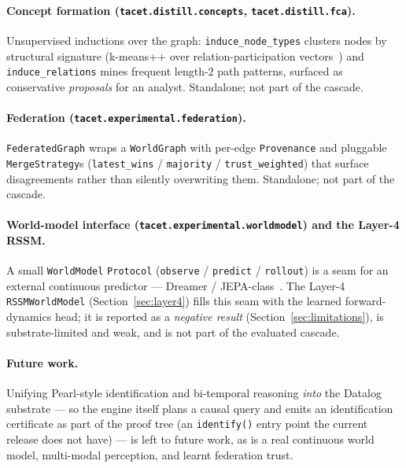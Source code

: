 \documentclass[11pt]{article}
\theoremstyle{plain}
\begin{document}
\paragraph{Concept formation (\texttt{tacet.distill.concepts}, \texttt{tacet.distill.fca}).}
Unsupervised inductions over the graph: \texttt{induce\_node\_types} clusters
nodes by structural signature (k-means++ over relation-participation
vectors~\citep{arthur2007kmeanspp}) and \texttt{induce\_relations} mines
frequent length-2 path patterns, surfaced as conservative \emph{proposals} for
an analyst. Standalone; not part of the cascade.

\paragraph{Federation (\texttt{tacet.experimental.federation}).}
\texttt{FederatedGraph} wraps a \texttt{WorldGraph} with per-edge
\texttt{Provenance} and pluggable \texttt{MergeStrategy}s
(\texttt{latest\_wins} / \texttt{majority} / \texttt{trust\_weighted}) that
surface disagreements rather than silently overwriting them. Standalone; not
part of the cascade.

\paragraph{World-model interface (\texttt{tacet.experimental.worldmodel}) and the Layer-4 RSSM.}
A small \texttt{WorldModel} \texttt{Protocol} (\texttt{observe} /
\texttt{predict} / \texttt{rollout}) is a seam for an external continuous
predictor --- Dreamer / JEPA-class~\citep{ha2018worldmodels,lecun2022jepa}. The
Layer-4 \texttt{RSSMWorldModel} (Section~\ref{sec:layer4}) fills this seam with
the learned forward-dynamics head; it is reported as a \emph{negative result}
(Section~\ref{sec:limitations}), is substrate-limited and weak, and is not part
of the evaluated cascade.

\paragraph{Future work.}
Unifying Pearl-style identification and bi-temporal reasoning \emph{into} the
Datalog substrate --- so the engine itself plans a causal query and emits an
identification certificate as part of the proof tree (an \texttt{identify()}
entry point the current release does not have) --- is left to future work, as
is a real continuous world model, multi-modal perception, and learnt
federation trust.
\end{document}

